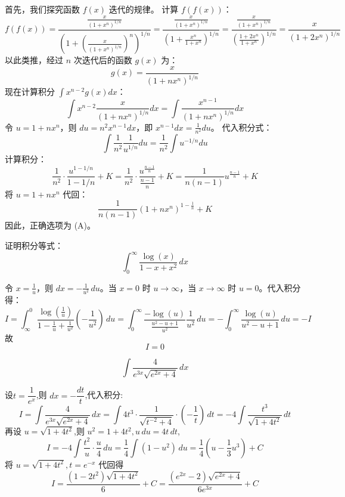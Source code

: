 \begin{questions}
\begin{solution}
首先，我们探究函数 $f(x)$ 迭代的规律。
计算 $f(f(x))$：
\[
f(f(x)) = \frac{\frac{x}{(1+x^n)^{1/n}}}{\left( 1 + \left( \frac{x}{(1+x^n)^{1/n}} \right)^n \right)^{1/n}} = \frac{\frac{x}{(1+x^n)^{1/n}}}{\left( 1 + \frac{x^n}{1+x^n} \right)^{1/n}} = \frac{\frac{x}{(1+x^n)^{1/n}}}{\left( \frac{1+2x^n}{1+x^n} \right)^{1/n}} = \frac{x}{(1+2x^n)^{1/n}}
\]
以此类推，经过 $n$ 次迭代后的函数 $g(x)$ 为：
\[
g(x) = \frac{x}{(1+nx^n)^{1/n}}
\]
现在计算积分 $\int x^{n-2} g(x) dx$：
\[
\int x^{n-2} \frac{x}{(1+nx^n)^{1/n}} dx = \int \frac{x^{n-1}}{(1+nx^n)^{1/n}} dx
\]
令 $u = 1 + nx^n$，则 $du = n^2 x^{n-1} dx$，即 $x^{n-1} dx = \frac{1}{n^2} du$。
代入积分式：
\[
\int \frac{1}{n^2} \frac{1}{u^{1/n}} du = \frac{1}{n^2} \int u^{-1/n} du
\]
计算积分：
\[
\frac{1}{n^2} \cdot \frac{u^{1 - 1/n}}{1 - 1/n} + K = \frac{1}{n^2} \cdot \frac{u^{\frac{n-1}{n}}}{\frac{n-1}{n}} + K = \frac{1}{n(n-1)} u^{\frac{n-1}{n}} + K
\]
将 $u = 1 + nx^n$ 代回：
\[
\frac{1}{n(n-1)} \left( 1 + nx^n \right)^{1 - \frac{1}{n}} + K
\]
因此，正确选项为 (A)。
\end{solution}

\question
证明积分等式：
\[
\int_{0}^{\infty} \frac{\log(x)}{1-x+x^2} \, dx 
\]

\begin{solution}
令 \(x = \frac{1}{u}\)，则 \(dx = -\frac{1}{u^2} \, du\)。当 \(x=0\) 时 \(u \to \infty\)，当 \(x \to \infty\) 时 \(u=0\)。代入积分得：
\[
I=\int_{\infty}^{0} \frac{\log\left(\frac{1}{u}\right)}{1-\frac{1}{u}+\frac{1}{u^2}} \left(-\frac{1}{u^2}\right) \, du = \int_{0}^{\infty} \frac{-\log(u)}{\frac{u^2-u+1}{u^2}} \frac{1}{u^2} \, du = -\int_{0}^{\infty} \frac{\log(u)}{u^2-u+1} \, du =-I
\]
故
\[
I=0
\]
\end{solution}
    \question 
    \[
    \int \frac{4}{e^{3x}\sqrt{e^{2x}+4}} \, dx
    \]
    \begin{solution}
        设$t = \dfrac{1}{e^x}$,则 $dx = -\dfrac{dt}{t}$,代入积分:
        \[
        I=\int \frac{4}{e^{3x}\sqrt{e^{2x}+4}} \, dx 
        = \int 4t^3 \cdot \frac{1}{\sqrt{t^{-2}+4}} \cdot \left(-\frac{1}{t}\right) \, dt
        = -4 \int \frac{t^3}{\sqrt{1+4t^2}} \, dt
        \]
        再设 $u = \sqrt{1+4t^2}$,则 $u^2 = 1+4t^2,u \, du = 4t \, dt$,
        \[
        I = -4 \int \frac{t^2}{u} \cdot \frac{u}{4} \, du 
        = \frac{1}{4} \int (1 - u^2) \, du 
        = \frac{1}{4} \left( u - \frac{1}{3}u^3 \right) + C
        \]
        将 $u = \sqrt{1+4t^2}, t= e^{-x}$ 代回得
        \[
        I = \frac{(1 - 2t^2)\sqrt{1+4t^2}}{6} + C = \frac{(e^{2x}-2)\sqrt{e^{2x}+4}}{6e^{3x}} + C
        \]
    \end{solution}


\end{questions}
